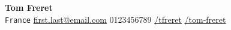 \documentclass[letterpaper,11pt]{article}
\begin{document}
\begin{center}
  \textbf{\Huge Tom Freret} \\ \vspace{3pt}
  \small \faMapMarker* \hspace{2pt}\texttt{France} \hspace{1pt}
  \hspace{1pt} \faEnvelope \hspace{2pt} \href{mailto:first.last@email.com}{first.last@email.com} \hspace{1pt}
  \hspace{1pt} \faPhone \hspace{2pt} 0123456789 \hspace{1pt}
  \hspace{1pt} \faGithub \hspace{2pt} \href{https://github.com/tfreret}{/tfreret} \hspace{1pt}
  \hspace{1pt} \faLinkedinIn \hspace{2pt} \href{https://linkedin.com/tom-freret}{/tom-freret} \hspace{1pt}
\end{center}


\end{document}
